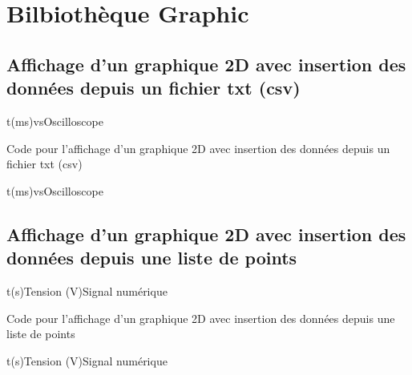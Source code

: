 \chapter{Bilbiothèque Graphic}

\section{Affichage d'un graphique 2D avec insertion des données depuis un fichier txt (csv)}

\begin{graphic}{0.8}{0.6}{0}{2.1}{-1.1}{1.1}{t(ms)}{vs}{Oscilloscope}
\end{graphic}

\begin{Latex}{Code pour l'affichage d'un graphique 2D avec insertion des données depuis un fichier txt (csv)}
\begin{graphic}{0.8}{0.6}{0}{2.1}{-1.1}{1.1}{t(ms)}{vs}{Oscilloscope}
\end{graphic}
\end{Latex}



\section{Affichage d'un graphique 2D avec insertion des données depuis une liste de points}

\begin{graphic}{0.8}{0.4}{0}{40}{-1}{6}{t(s)}{Tension (V)}{Signal numérique}
\end{graphic}

\begin{Latex}{Code pour l'affichage d'un graphique 2D avec insertion des données depuis une liste de points}
\begin{graphic}{0.8}{0.4}{0}{40}{-1}{6}{t(s)}{Tension (V)}{Signal numérique}
\end{graphic}
\end{Latex}


